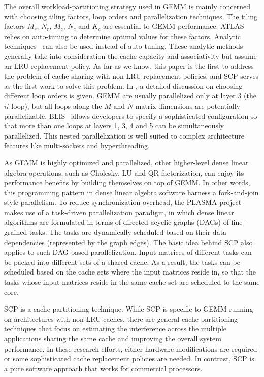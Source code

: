 The overall workload-partitioning strategy used in
GEMM is mainly concerned with choosing 
tiling factors, loop orders and parallelization
techniques.
The tiling factors $M_r$, $N_r$, $M_c$, $N_c$ and $K_c$
are essential to GEMM performance.
ATLAS~\cite{atlas} relies on auto-tuning to determine optimal
values for these factors.
Analytic techniques~\cite{analytic1,analytic2,blisanalytic} 
can also be used instead of auto-tuning.
These analytic methods generally take into consideration
the cache capacity and associativity
but assume an LRU replacement policy.
As far as we know, this paper is the first to
address the problem of cache sharing with non-LRU replacement policies,
and SCP serves as the first work to solve this problem.
In \cite{gotogemm}, a detailed discussion on
choosing different loop orders is given.
GEMM are usually parallelized only at layer 3 (the $ii$ loop),
but all loops along the $M$ and $N$ matrix dimensions
are potentially parallelizable.
BLIS~\cite{blispar} allows developers to specify a sophisticated configuration
so that more than one loops at layers 1, 3, 4 and 5
can be simultaneously parallelized.
This nested parallelization is well suited to complex architecture features
like multi-sockets and hyperthreading. 

As GEMM is highly optimized and parallelized,
other higher-level dense linear algebra operations,
such as Cholesky, LU and QR factorization, can
enjoy its performance benefits by building themselves
on top of GEMM.
In other words, this programming pattern in dense linear algebra software
harness a fork-and-join style parallelism.
To reduce synchronization overhead,
the PLASMA project~\cite{plasma2009,plasma2010,plasma2017}
makes use of a task-driven parallelization paradigm,
in which dense linear algorithms are formulated in
terms of 
directed-acyclic-graphs (DAGs) of fine-grained tasks.
The tasks are dynamically scheduled based on their
data dependencies (represented by the graph edges).
The basic idea behind SCP also applies to such
DAG-based parallelization.
Input matrices of different tasks can be packed into
different sets of a shared cache. As a result, 
the tasks can be scheduled based on the cache sets 
where the input matrices reside in, so that
the tasks whose input matrices reside 
in the same cache set
are scheduled to the same core.

SCP is a cache partitioning technique.
While SCP is specific to GEMM running on architectures
with non-LRU caches,
there are general cache partitioning techniques \cite{cp0, cp1, cp2}
that focus on estimating the interference across 
the multiple applications
sharing the same cache and improving the
overall system performance.
In these research efforts, either hardware modifications are required
or some sophisticated cache replacement policies are 
needed.
In contrast,
SCP is a pure software approach that works for 
commercial processors.

